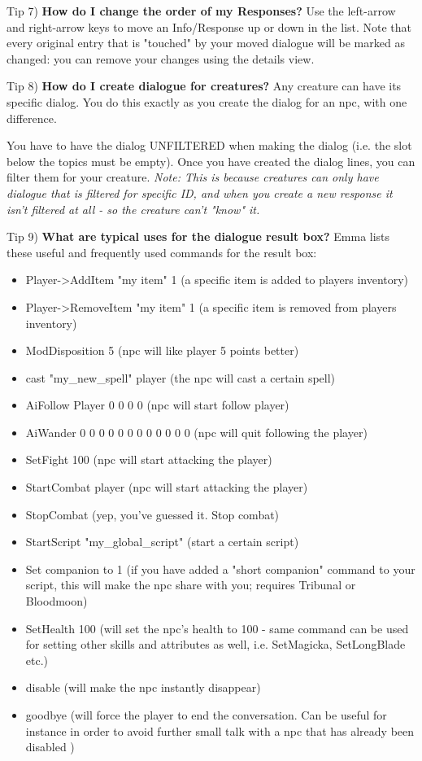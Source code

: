 \documentclass[
]{article}
\begin{document}
Tip 7) \textbf{How do I change the order of my Responses?} Use the
left-arrow and right-arrow keys to move an Info/Response up or down in
the list. Note that every original entry that is "touched" by your moved
dialogue will be marked as changed: you can remove your changes using
the details view.

Tip 8) \textbf{How do I create dialogue for creatures?} Any creature can
have its specific dialog. You do this exactly as you create the dialog
for an npc, with one difference.

You have to have the dialog UNFILTERED when making the dialog (i.e. the
slot below the topics must be empty). Once you have created the dialog
lines, you can filter them for your creature. \emph{Note: This is
because creatures can only have dialogue that is filtered for specific
ID, and when you create a new response it isn't filtered at all - so the
creature can't "know" it.}

Tip 9) \textbf{What are typical uses for the dialogue result box?} Emma
lists these useful and frequently used commands for the result box:

\begin{itemize}
\item
  Player-\textgreater AddItem "my item" 1 (a specific item is added to
  players inventory)
\item
  Player-\textgreater RemoveItem "my item" 1 (a specific item is removed
  from players inventory)
\item
  ModDisposition 5 (npc will like player 5 points better)
\item
  cast "my\_new\_spell" player (the npc will cast a certain spell)
\item
  AiFollow Player 0 0 0 0 (npc will start follow player)
\item
  AiWander 0 0 0 0 0 0 0 0 0 0 0 0 (npc will quit following the player)
\item
  SetFight 100 (npc will start attacking the player)
\item
  StartCombat player (npc will start attacking the player)
\item
  StopCombat (yep, you've guessed it. Stop combat)
\item
  StartScript "my\_global\_script" (start a certain script)
\item
  Set companion to 1 (if you have added a "short companion" command to
  your script, this will make the npc share with you; requires Tribunal
  or Bloodmoon)
\item
  SetHealth 100 (will set the npc's health to 100 - same command can be
  used for setting other skills and attributes as well, i.e. SetMagicka,
  SetLongBlade etc.)
\item
  disable (will make the npc instantly disappear)
\item
  goodbye (will force the player to end the conversation. Can be useful
  for instance in order to avoid further small talk with a npc that has
  already been disabled )
\end{itemize}
\end{document}
